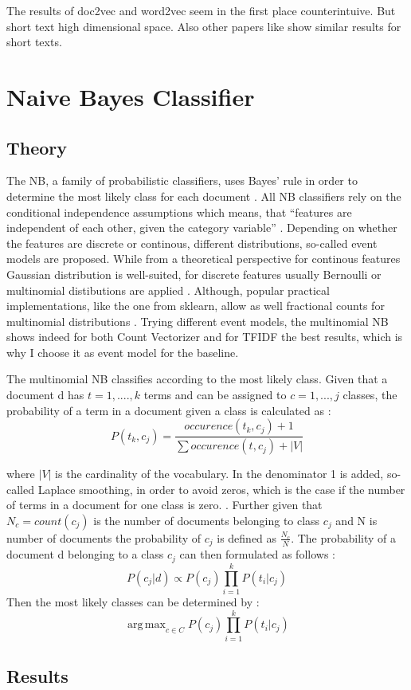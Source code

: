 \documentclass[12pt, a4paper, titlepage]{article}
\DeclareMathOperator*{\argmax}{arg\,max}
\begin{document}
\citet{singh2022} The results of doc2vec and word2vec seem in the first place counterintuive. But short text high dimensional space. Also other papers like \citet{singh2022} show similar results for short texts.

\clearpage





\appendix
\section{Naive Bayes Classifier}
\subsection{Theory}
The \ac{NB}, a family of probabilistic classifiers, uses Bayes' rule in order to determine the most likely class for each document \citep{Schneider2005}. All \ac{NB} classifiers rely on the conditional independence assumptions which means, that ``features are independent of each other, given the category variable'' \citep[48]{Xu2018}. Depending on whether the features are discrete or continous, different distributions, so-called event models are proposed. While from a theoretical perspective for continous features Gaussian distribution is well-suited, for discrete features usually Bernoulli or multinomial distibutions are applied \citep{Xu2018}. Although, popular practical implementations, like the one from sklearn, allow as well fractional counts for multinomial distributions \citep{scikit-learn}. Trying different event models, the multinomial \ac{NB} shows indeed for both Count Vectorizer and for TFIDF the best results, which is why I choose it as event model for the baseline. 

The multinomial \ac{NB} classifies according to the most likely class. Given that a document d has $t = 1, ...., k$ terms and can be assigned to $c = 1,...,j$ classes, the probability of a term in a document given a class is calculated as \citep{Manning2008}:
\[ P(t_k, c_j) = \frac{occurence(t_k, c_j) + 1}{\sum occurence(t, c_j) + |V|} \]

where $|V|$ is the cardinality of the vocabulary. In the denominator 1 is added, so-called Laplace smoothing, in order to avoid zeros, which is the case if the number of terms in a document for one class is zero. \citep{Manning2008}. Further given that $N_c = count(c_j)$ is the number of documents belonging to class $c_j$ and N is number of documents the probability of $c_j$ is defined as $\frac{N_c}{N}$. The probability of a document d belonging to a class $c_j$ can then formulated as follows \citep[258]{Manning2008}:
\[ P(c_j|d) \propto P(c_j) \prod_{i = 1}^k P(t_i|c_j) \]
Then the most likely classes can be determined by \citep{Manning2008}: 
\[\argmax_{c \in C} P(c_j) \prod_{i = 1}^k P(t_i|c_j) \] 

\subsection{Results}
\end{document}
